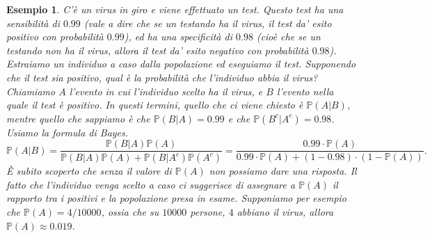 \documentclass[11pt]{book}
\theoremstyle{Definizione}
\theoremstyle{TeoremaProposizioneLemmaCorollario}
\theoremstyle{OsservazioneNota}
\newtheorem{myes}{Esempio}[section]
\renewcommand{\P}{\mathbb{P}}
\begin{document}
\begin{myes}
C'è un virus in giro e viene effettuato un test. Questo test ha una sensibilità di $0.99$ (vale a dire che se un testando ha il virus, il test da' esito positivo con probabilità $0.99$), ed ha una specificità di $0.98$ (cioè che se un testando non ha il virus, allora il test da' esito negativo con probabilità $0.98$).
Estraiamo un individuo a caso dalla popolazione ed eseguiamo il test. Supponendo che il test sia positivo, qual è la probabilità che l'individuo abbia il virus?\\
Chiamiamo $A$ l'evento in cui l'individuo scelto ha il virus, e $B$ l'evento nella quale il test è positivo. In questi termini, quello che ci viene chiesto è $\P(A|B)$, mentre quello che sappiamo è che $\P(B|A) = 0.99$ e che $\P(B^c|A^c) = 0.98$.\\
Usiamo la formula di Bayes.
$$
\P(A|B) = \frac{\P(B|A)\P(A)}{\P(B|A)\P(A)+\P(B|A^c)\P(A^c)} = \frac{0.99 \cdot \P(A)}{0.99 \cdot \P(A) + (1-0.98)\cdot (1-\P(A))}.
$$
È subito scoperto che senza il valore di $\P(A)$ non possiamo dare una risposta. Il fatto che l'individuo venga scelto a caso ci suggerisce di assegnare a $\P(A)$ il rapporto tra i positivi e la popolazione presa in esame. Supponiamo per esempio che $\P(A) = 4/10000$, ossia che su $10000$ persone, $4$ abbiano il virus, allora $\P(A) \approx 0.019$.
\end{myes}
\end{document}
